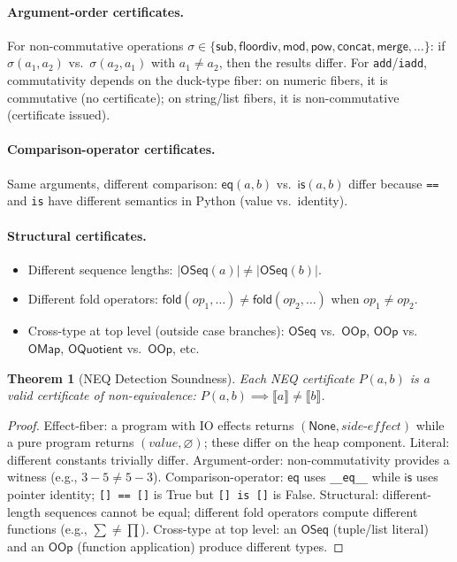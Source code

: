 \documentclass[11pt,a4paper]{report}
\theoremstyle{definition}
\theoremstyle{plain}
\newtheorem{theorem}[definition]{Theorem}
\newcommand{\den}[1]{\llbracket #1 \rrbracket}
\newcommand{\fold}{\mathsf{fold}}
\begin{document}
\paragraph{Argument-order certificates.}
For non-commutative operations
$\sigma \in \{\mathsf{sub}, \mathsf{floordiv}, \mathsf{mod},
\mathsf{pow}, \mathsf{concat}, \mathsf{merge}, \ldots\}$:
if $\sigma(a_1, a_2)$ vs.\ $\sigma(a_2, a_1)$ with
$a_1 \neq a_2$, then the results differ.
For \texttt{add}/\texttt{iadd}, commutativity depends on the
duck-type fiber: on numeric fibers, it is commutative (no
certificate); on string/list fibers, it is non-commutative
(certificate issued).

\paragraph{Comparison-operator certificates.}
Same arguments, different comparison:
$\mathsf{eq}(a, b)$ vs.\ $\mathsf{is}(a, b)$ differ because
\texttt{==} and \texttt{is} have different semantics in Python
(value vs.\ identity).

\paragraph{Structural certificates.}
\begin{itemize}
  \item Different sequence lengths:
    $|\mathsf{OSeq}(a)| \neq |\mathsf{OSeq}(b)|$.
  \item Different fold operators:
    $\fold(\mathit{op}_1, \ldots) \neq \fold(\mathit{op}_2, \ldots)$
    when $\mathit{op}_1 \neq \mathit{op}_2$.
  \item Cross-type at top level (outside case branches):
    $\mathsf{OSeq}$ vs.\ $\mathsf{OOp}$,
    $\mathsf{OOp}$ vs.\ $\mathsf{OMap}$,
    $\mathsf{OQuotient}$ vs.\ $\mathsf{OOp}$, etc.
\end{itemize}

\begin{theorem}[NEQ Detection Soundness]
\label{thm:neq-soundness}
Each NEQ certificate $P(a, b)$ is a valid certificate of
non-equivalence: $P(a, b) \implies \den{a} \neq \den{b}$.
\end{theorem}

\begin{proof}
Effect-fiber: a program with IO effects returns
$(\mathsf{None}, \mathit{side\text{-}effect})$ while a pure
program returns $(\mathit{value}, \varnothing)$; these differ
on the heap component.
Literal: different constants trivially differ.
Argument-order: non-commutativity provides a witness
(e.g., $3 - 5 \neq 5 - 3$).
Comparison-operator: $\mathsf{eq}$ uses \texttt{\_\_eq\_\_} while
$\mathsf{is}$ uses pointer identity; \texttt{[] == []} is True
but \texttt{[] is []} is False.
Structural: different-length sequences cannot be equal;
different fold operators compute different functions
(e.g., $\sum \neq \prod$).
Cross-type at top level: an $\mathsf{OSeq}$ (tuple/list literal)
and an $\mathsf{OOp}$ (function application) produce different
types.
\end{proof}
\end{document}
